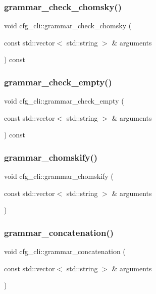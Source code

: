 \subsubsection{\texorpdfstring{grammar\_check\_chomsky()}{grammar\_check\_chomsky()}}
{\footnotesize\ttfamily void cfg\+\_\+cli\+::grammar\+\_\+check\+\_\+chomsky (\begin{DoxyParamCaption}\item[{const std\+::vector$<$ std\+::string $>$ \&}]{arguments }\end{DoxyParamCaption}) const}

\mbox{\label{classcfg__cli_ac8c3f52a81dc07bf8f9fe231e1e116f7}} 
\subsubsection{\texorpdfstring{grammar\_check\_empty()}{grammar\_check\_empty()}}
{\footnotesize\ttfamily void cfg\+\_\+cli\+::grammar\+\_\+check\+\_\+empty (\begin{DoxyParamCaption}\item[{const std\+::vector$<$ std\+::string $>$ \&}]{arguments }\end{DoxyParamCaption}) const}

\mbox{\label{classcfg__cli_ad4a441afca336701561e489689e60b6a}} 
\subsubsection{\texorpdfstring{grammar\_chomskify()}{grammar\_chomskify()}}
{\footnotesize\ttfamily void cfg\+\_\+cli\+::grammar\+\_\+chomskify (\begin{DoxyParamCaption}\item[{const std\+::vector$<$ std\+::string $>$ \&}]{arguments }\end{DoxyParamCaption})}

\mbox{\label{classcfg__cli_a351532c63ecdd76043c8f906d297c0bf}} 
\subsubsection{\texorpdfstring{grammar\_concatenation()}{grammar\_concatenation()}}
{\footnotesize\ttfamily void cfg\+\_\+cli\+::grammar\+\_\+concatenation (\begin{DoxyParamCaption}\item[{const std\+::vector$<$ std\+::string $>$ \&}]{arguments }\end{DoxyParamCaption})}

